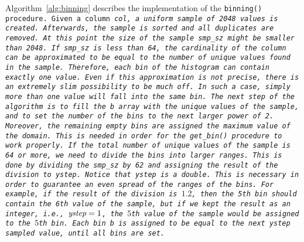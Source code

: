 Algorithm~\ref{alg:binning} describes the implementation of the
\tt{binning()} procedure. Given a column \it{col}, a uniform sample of
2048 values is created. Afterwards, the sample is sorted and all duplicates are
removed. At this point the size of the sample \it{smp\_sz} might be smaller
than 2048. If \it{smp\_sz} is less than 64, the cardinality of the column
can be approximated to be equal to the number of unique values
found in the sample. Therefore, each bin of the histogram can contain exactly
one value. Even if this approximation is not precise, there is an extremely
slim possibility to be much off. In such a case, simply more than one value
will fall into the same bin. The next step of the algorithm is to fill the
\it{b} array with the unique values of the sample, and to set the number of
the \it{bins} to the next larger power of 2. Moreover,
the remaining empty bins are assigned the maximum value of the domain. This is
needed in order for the \tt{get\_bin()} procedure to work properly. If the
total number of unique values of the sample is 64 or more, we need to divide
the
bins into larger ranges. This is done by dividing the \it{smp\_sz} by 62 and
assigning
the result of the division to \it{ystep}. Notice that \it{ystep} is a double.
This is necessary in order to guarantee an even spread of the ranges of the
bins. For example, if the result of the division is $1.2$, then the 5th bin
should contain the 6th value of the sample, but if we kept the result as an
integer, i.e., $\it{ystep}=1$, the $5$th value of the sample would be
assigned to the $5$th bin. Each bin \it{b} is assigned to be equal to the
next \it{ystep} sampled value, until all bins are set.


